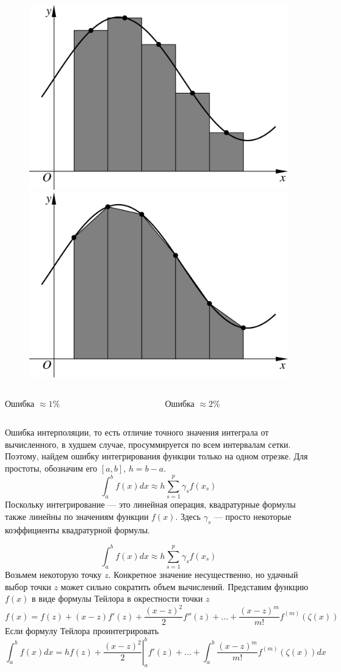 \documentclass[professionalfonts,compress,unicode]{beamer}
\begin{document}
{
	\begin{figure}%
	\includegraphics[width=0.5\columnwidth]{rect.pdf}%
	\includegraphics[width=0.5\columnwidth]{trap.pdf}%
	\end{figure}
	\pause
	
	\begin{columns}[c]
	\begin{column}{0.5\textwidth}
	\centering
	Ошибка $\approx 1\%$
	\end{column}
	\begin{column}{0.5\textwidth}
	\centering
	Ошибка $\approx 2\%$
	\end{column}
	\end{columns}
}

{
	Ошибка интерполяции, то есть отличие точного значения интеграла от вычисленного, в худшем случае,
	просуммируется по всем интервалам сетки. Поэтому, найдем ошибку интегрирования функции только на одном отрезке.
	Для простоты, обозначим его $[a,b], \, h = b-a$.
	$$
	\int_a^b f(x) dx \approx h \sum_{s=1}^p \gamma_s f(x_s) 
	$$
	\pause
	Поскольку интегрирование --- это линейная операция,
	квадратурные формулы также линейны по значениям функции $f(x)$. Здесь $\gamma_s$ --- просто некоторые 
	коэффициенты квадратурной формулы.
}

{
	$$
	\int_a^b f(x) dx \approx h \sum_{s=1}^p \gamma_s f(x_s) 
	$$
	Возьмем некоторую точку $z$. Конкретное значение несущественно, но удачный выбор точки $z$ может сильно сократить объем 
	вычислений. \pause Представим функцию $f(x)$ в виде формулы Тейлора в окрестности точки $z$
	$$
	f(x) = f(z) + (x-z)f'(z) + \frac{(x-z)^2}{2}f''(z) + \dots + \frac{(x-z)^{m}}{m!}f^{(m)}(\zeta(x))
	$$
	Если формулу Тейлора проинтегрировать
	$$
	\int_a^b f(x) dx = h f(z) + \left.\frac{(x-z)^2}{2}\right|_a^b f'(z) + \dots + \int_a^b \frac{(x-z)^{m}}{m!}f^{(m)}(\zeta(x)) dx
	$$
}
\end{document}
